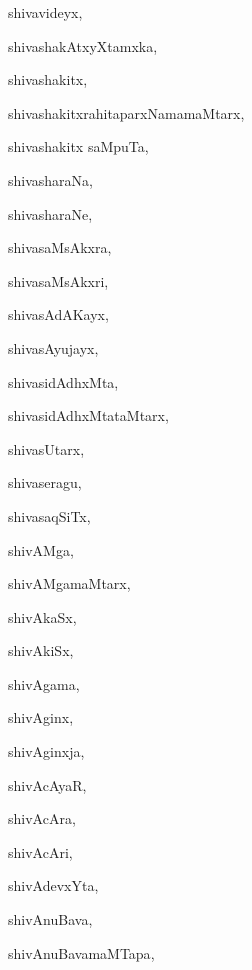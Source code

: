 \begin{multicols}{3}
{\noindent
{shivavideyx}, \pageref{shivavideyx}

\noindent
{shivashakAtxyXtamxka}, \pageref{shivashakAtxyXtamxka}

\noindent
{shivashakitx}, \pageref{shivashakitx}

\noindent
{shivashakitxrahitaparxNamamaMtarx}, \pageref{shivashakitxrahitaparxNamamaMtarx}

\noindent
{shivashakitx saMpuTa}, \pageref{shivashakitxsaMpuTa}

\noindent
{shivasharaNa}, \pageref{shivasharaNa}

\noindent
{shivasharaNe}, \pageref{shivasharaNe}

\noindent
{shivasaMsAkxra}, \pageref{shivasaMsAkxra}

\noindent
{shivasaMsAkxri}, \pageref{shivasaMsAkxri}

\noindent
{shivasAdAKayx}, \pageref{shivasAdAKayx}

\noindent
{shivasAyujayx}, \pageref{shivasAyujayx}

\noindent
{shivasidAdhxMta}, \pageref{shivasidAdhxMta}

\noindent
{shivasidAdhxMtataMtarx}, \pageref{shivasidAdhxMtataMtarx}

\noindent
{shivasUtarx}, \pageref{shivasUtarx}

\noindent
{shivaseragu}, \pageref{shivaseragu}

\noindent
{shivasaqSiTx}, \pageref{shivasaqSiTx}

\noindent
{shivAMga}, \pageref{shivAMga}

\noindent
{shivAMgamaMtarx}, \pageref{shivAMgamaMtarx}

\noindent
{shivAkaSx}, \pageref{shivAkaSx}

\noindent
{shivAkiSx}, \pageref{shivAkiSx}

\noindent
{shivAgama}, \pageref{shivAgama}

\noindent
{shivAginx}, \pageref{shivAginx}

\noindent
{shivAginxja}, \pageref{shivAginxja}

\noindent
{shivAcAyaR}, \pageref{shivAcAyaR}

\noindent
{shivAcAra}, \pageref{shivAcAra}

\noindent
{shivAcAri}, \pageref{shivAcAri}

\noindent
{shivAdevxYta}, \pageref{shivAdevxYta}

\noindent
{shivAnuBava}, \pageref{shivAnuBava}

\noindent
{shivAnuBavamaMTapa}, \pageref{shivAnuBavamaMTapa}

}
\end{multicols}
